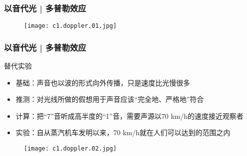 \begin{frame}
  \frametitle{以音代光 | 多普勒效应}
    \begin{figure}
      \centering
      \texttt{[image: c1.doppler.01.jpg]}
    \end{figure}
\end{frame}

\begin{frame}
  \frametitle{以音代光 | 多普勒效应}
  \begin{block}{替代实验}
    \begin{itemize}
      \item 基础：声音也以波的形式向外传播，只是速度比光慢很多
      \item 推测：对光线所做的假想用于声音应该“完全地、严格地”符合
      \item 计算：把“7”音听成高半度的“1”音，需要声源以70 km/h的速度接近观察者
      \item 实验：自从蒸汽机车发明以来，70 km/h就在人们可以达到的范围之内
    \end{itemize}
    \vspace{-1.5em}
    \begin{figure}
      \centering
      \texttt{[image: c1.doppler.02.jpg]}
    \end{figure}
  \end{block}
\end{frame}

